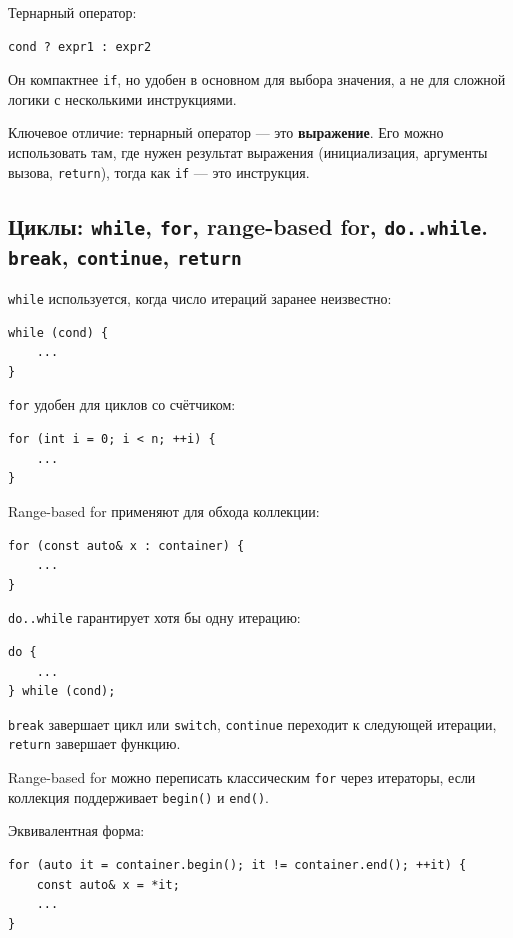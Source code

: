 Тернарный оператор:
\begin{verbatim}
cond ? expr1 : expr2
\end{verbatim}

Он компактнее \texttt{if}, но удобен в основном для выбора значения, а не для сложной логики с несколькими инструкциями.

Ключевое отличие: тернарный оператор — это \textbf{выражение}. Его можно использовать там, где нужен результат выражения (инициализация, аргументы вызова, \texttt{return}), тогда как \texttt{if} — это инструкция.

\subsection{Циклы: \texttt{while}, \texttt{for}, range-based for, \texttt{do..while}. \texttt{break}, \texttt{continue}, \texttt{return}}
\texttt{while} используется, когда число итераций заранее неизвестно:
\begin{verbatim}
while (cond) {
    ...
}
\end{verbatim}

\texttt{for} удобен для циклов со счётчиком:
\begin{verbatim}
for (int i = 0; i < n; ++i) {
    ...
}
\end{verbatim}

Range-based for применяют для обхода коллекции:
\begin{verbatim}
for (const auto& x : container) {
    ...
}
\end{verbatim}

\texttt{do..while} гарантирует хотя бы одну итерацию:
\begin{verbatim}
do {
    ...
} while (cond);
\end{verbatim}

\texttt{break} завершает цикл или \texttt{switch}, \texttt{continue} переходит к следующей итерации, \texttt{return} завершает функцию.

\begin{remark}
Range-based for можно переписать классическим \texttt{for} через итераторы, если коллекция поддерживает \texttt{begin()} и \texttt{end()}.
\end{remark}

Эквивалентная форма:
\begin{verbatim}
for (auto it = container.begin(); it != container.end(); ++it) {
    const auto& x = *it;
    ...
}
\end{verbatim}

